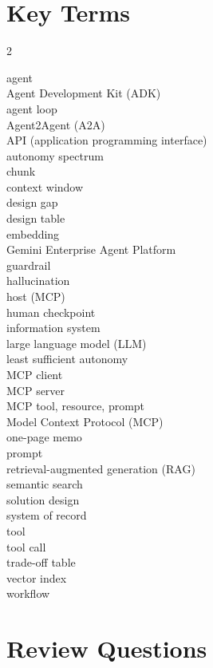 \section*{Key Terms}

\begin{multicols}{2}
\raggedright\small
agent \\
Agent Development Kit (ADK) \\
agent loop \\
Agent2Agent (A2A) \\
API (application programming interface) \\
autonomy spectrum \\
chunk \\
context window \\
design gap \\
design table \\
embedding \\
Gemini Enterprise Agent Platform \\
guardrail \\
hallucination \\
host (MCP) \\
human checkpoint \\
information system \\
large language model (LLM) \\
least sufficient autonomy \\
MCP client \\
MCP server \\
MCP tool, resource, prompt \\
Model Context Protocol (MCP) \\
one-page memo \\
prompt \\
retrieval-augmented generation (RAG) \\
semantic search \\
solution design \\
system of record \\
tool \\
tool call \\
trade-off table \\
vector index \\
workflow
\end{multicols}

\section*{Review Questions}

